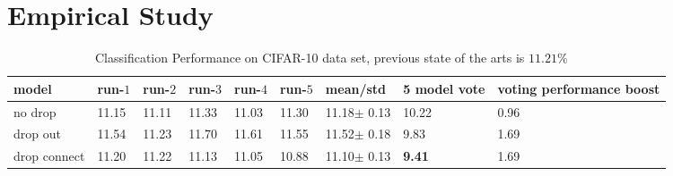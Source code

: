 \documentclass[9pt]{article}
\begin{document}
\section{Empirical Study}
\begin{table}[ht]
    \begin{center}
        \begin{tabular}{|l|l|l|l|l|l|l|l|p{3cm}|}
            \hline
            model & run-$1$ & run-$2$ & run-$3$ & run-$4$ & run-$5$ & mean/std & 5 model vote & voting performance boost \\
            \hline
            no drop & 11.15 & 11.11 & 11.33 & 11.03 & 11.30 & 11.18$\pm$ 0.13 & 10.22 & 0.96 \\
           drop out & 11.54 & 11.23 & 11.70 & 11.61 & 11.55 & 11.52$\pm$ 0.18 & 9.83 & 1.69 \\
    drop connect & 11.20 & 11.22 & 11.13 & 11.05 & 10.88 & 11.10$\pm$ 0.13 & {\bf 9.41} & 1.69 \\
            \hline
        \end{tabular}
    \end{center}
    \caption{
        Classification Performance on CIFAR-10 data set, previous state of the arts is $11.21\%$
        ~\cite{Schmidhuber2012}
    }
\end{table}


\end{document}
